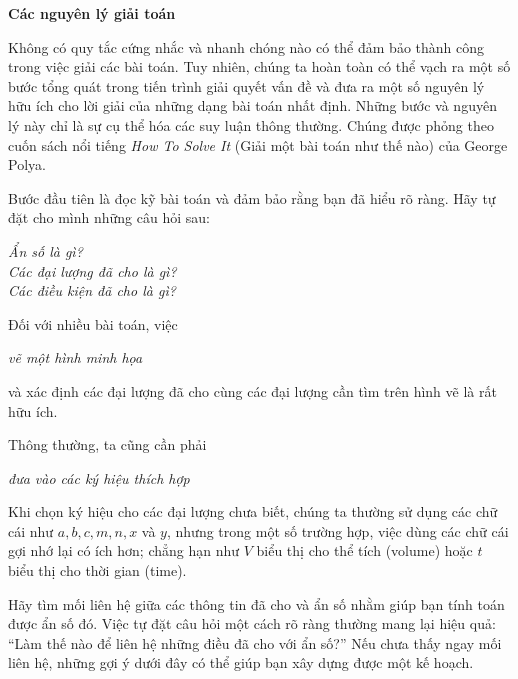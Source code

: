 \begin{minipage}[t]{0.72\textwidth}
    {\fontsize{22}{26}\selectfont\textbf{\textsf{\textcolor{stewartpurple}{Các nguyên lý giải toán}}}}\par
    \vspace{0.4cm}
    Không có quy tắc cứng nhắc và nhanh chóng nào có thể đảm bảo thành công trong việc giải các bài toán. Tuy nhiên, chúng ta hoàn toàn có thể vạch ra một số bước tổng quát trong tiến trình giải quyết vấn đề và đưa ra một số nguyên lý hữu ích cho lời giải của những dạng bài toán nhất định. Những bước và nguyên lý này chỉ là sự cụ thể hóa các suy luận thông thường. Chúng được phỏng theo cuốn sách nổi tiếng \emph{How To Solve It} (Giải một bài toán như thế nào) của George Polya.

    \vspace{0.22cm}
    Bước đầu tiên là đọc kỹ bài toán và đảm bảo rằng bạn đã hiểu rõ ràng. Hãy tự đặt cho mình những câu hỏi sau:
    \begin{center}\vspace{-0.15cm}
        \itshape Ẩn số là gì?\\[0.1cm]
        Các đại lượng đã cho là gì?\\[0.1cm]
        Các điều kiện đã cho là gì?
    \vspace{-0.15cm}\end{center}

    Đối với nhiều bài toán, việc
    \begin{center}\vspace{-0.15cm}
        \itshape vẽ một hình minh họa
    \vspace{-0.15cm}\end{center}
    và xác định các đại lượng đã cho cùng các đại lượng cần tìm trên hình vẽ là rất hữu ích.

    Thông thường, ta cũng cần phải
    \begin{center}\vspace{-0.15cm}
        \itshape đưa vào các ký hiệu thích hợp
    \vspace{-0.15cm}\end{center}

    Khi chọn ký hiệu cho các đại lượng chưa biết, chúng ta thường sử dụng các chữ cái như $a, b, c, m, n, x$ và $y$, nhưng trong một số trường hợp, việc dùng các chữ cái gợi nhớ lại có ích hơn; chẳng hạn như $V$ biểu thị cho thể tích (volume) hoặc $t$ biểu thị cho thời gian (time).

    \vspace{0.25cm}
    Hãy tìm mối liên hệ giữa các thông tin đã cho và ẩn số nhằm giúp bạn tính toán được ẩn số đó. Việc tự đặt câu hỏi một cách rõ ràng thường mang lại hiệu quả: ``Làm thế nào để liên hệ những điều đã cho với ẩn số?'' Nếu chưa thấy ngay mối liên hệ, những gợi ý dưới đây có thể giúp bạn xây dựng được một kế hoạch.


\end{minipage}

